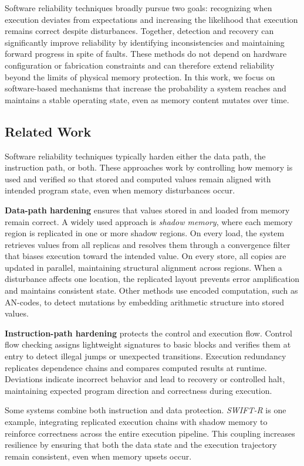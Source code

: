 Software reliability techniques broadly pursue two goals: recognizing when execution deviates from expectations and increasing the likelihood that execution remains correct despite disturbances. Together, detection and recovery can significantly improve reliability by identifying inconsistencies and maintaining forward progress in spite of faults. These methods do not depend on hardware configuration or fabrication constraints and can therefore extend reliability beyond the limits of physical memory protection. In this work, we focus on software-based mechanisms that increase the probability a system reaches and maintains a stable operating state, even as memory content mutates over time.

\subsection{Related Work}

Software reliability techniques typically harden either the data path, the instruction path, or both. These approaches work by controlling how memory is used and verified so that stored and computed values remain aligned with intended program state, even when memory disturbances occur.

\textbf{Data-path hardening} ensures that values stored in and loaded from memory remain correct. A widely used approach is \emph{shadow memory}, where each memory region is replicated in one or more shadow regions. On every load, the system retrieves values from all replicas and resolves them through a convergence filter that biases execution toward the intended value. On every store, all copies are updated in parallel, maintaining structural alignment across regions. When a disturbance affects one location, the replicated layout prevents error amplification and maintains consistent state. Other methods use encoded computation, such as AN-codes, to detect mutations by embedding arithmetic structure into stored values.

\textbf{Instruction-path hardening} protects the control and execution flow. Control flow checking assigns lightweight signatures to basic blocks and verifies them at entry to detect illegal jumps or unexpected transitions. Execution redundancy replicates dependence chains and compares computed results at runtime. Deviations indicate incorrect behavior and lead to recovery or controlled halt, maintaining expected program direction and correctness during execution.

Some systems combine both instruction and data protection. \emph{SWIFT-R} is one example, integrating replicated execution chains with shadow memory to reinforce correctness across the entire execution pipeline. This coupling increases resilience by ensuring that both the data state and the execution trajectory remain consistent, even when memory upsets occur.

